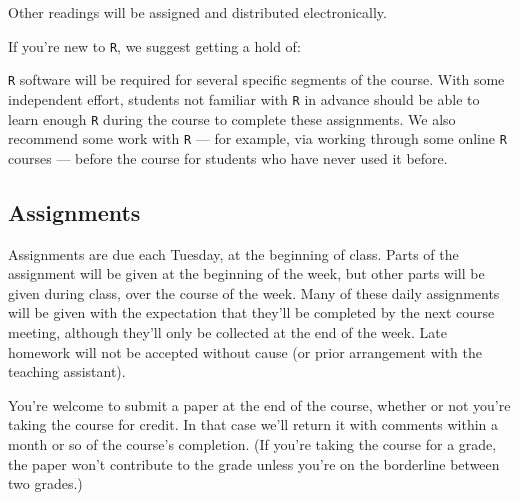 \documentclass[12pt]{article}
\begin{document}
Other readings will be assigned and distributed electronically.

If you're new to \texttt{R}, we suggest getting a hold of:

\begin{verse}   \end{verse}

\begin{verse}  \end{verse}


\texttt{R} software will be required for several specific segments of the course. With some independent effort, students not familiar with \texttt{R} in advance should be able to learn enough \texttt{R} during the course to complete these assignments. We also recommend some work with \texttt{R} --- for example, via working through some online \texttt{R} courses --- before the course for students who have never used it before.


\subsection*{Assignments}
Assignments are due each Tuesday, at the beginning of
class. Parts of the assignment will be given at the beginning of the
week, but other parts will be given during class, over the course of
the week.  Many of these daily assignments will be given with the
expectation that they'll be completed by the next course meeting,
although they'll only be collected at the end of the week.
Late homework will not be accepted without cause (or prior arrangement
with the teaching assistant).

You're welcome to submit a paper at the end of the course, whether or not you're taking the course for credit.  In that case we'll return it with comments within a month or so of the course's completion.  (If you're taking the course for a grade, the paper won't contribute to the grade unless you're on the borderline between two grades.)
\end{document}
